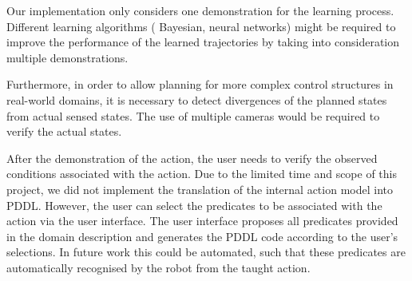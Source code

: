 
Our implementation only considers one demonstration for the learning process.
Different learning algorithms (\eg
Bayesian, neural networks) might be required to improve the performance of the learned trajectories by taking into consideration multiple demonstrations.

Furthermore, in order to allow planning for more complex control structures in real-world domains, it is necessary to detect divergences of the planned states from actual sensed states.
The use of multiple cameras would be required to verify the actual states.

After the demonstration of the action, the user needs to verify the observed conditions associated with the action.
Due to the limited time and scope of this project, we did not implement the translation of the internal action model into PDDL.
However, the user can select the predicates to be associated with the action via the user interface.
The user interface proposes all predicates provided in the domain description and generates the PDDL code according to the user's selections.
In future work this could be automated, such that these predicates are automatically recognised by the robot from the taught action.

